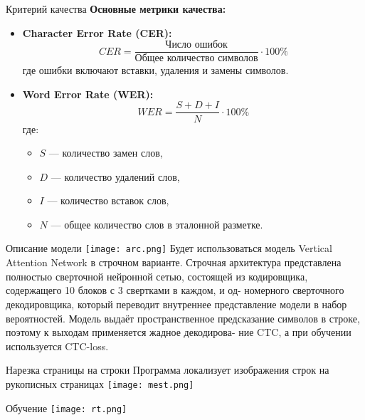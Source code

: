 \documentclass{beamer}
\begin{document}
\begin{frame}{Критерий качества}
    \textbf{Основные метрики качества:}
    \begin{itemize}
        \item \textbf{Character Error Rate (CER):}
        \[
        CER = \frac{\text{Число ошибок}}{\text{Общее количество символов}} \cdot 100\%
        \]
        где ошибки включают вставки, удаления и замены символов.
        \item \textbf{Word Error Rate (WER):}
        \[
        WER = \frac{S + D + I}{N} \cdot 100\%
        \]
        где:
        \begin{itemize}
            \item \(S\) — количество замен слов,
            \item \(D\) — количество удалений слов,
            \item \(I\) — количество вставок слов,
            \item \(N\) — общее количество слов в эталонной разметке.
        \end{itemize}
    \end{itemize}
\end{frame}


\begin{frame}{Описание модели}
    \texttt{[image: arc.png]}
    Будет использоваться модель Vertical Attention Network в строчном варианте. Строчная архитектура представлена полностью сверточной нейронной
сетью, состоящей из кодировщика, содержащего 10 блоков с 3 свертками в каждом, и од-
номерного сверточного декодировщика, который переводит внутреннее представление
модели в набор вероятностей. Модель выдаёт пространственное
предсказание символов в строке, поэтому к выходам применяется жадное декодирова-
ние CTC, а при обучении используется CTC-loss.
\end{frame}

\begin{frame}{Нарезка страницы на строки}
    Программа локализует изображения строк на рукописных страницах
    \texttt{[image: mest.png]}
\end{frame}

\begin{frame}{Обучение}
\texttt{[image: rt.png]}
\end{frame}
\end{document}
